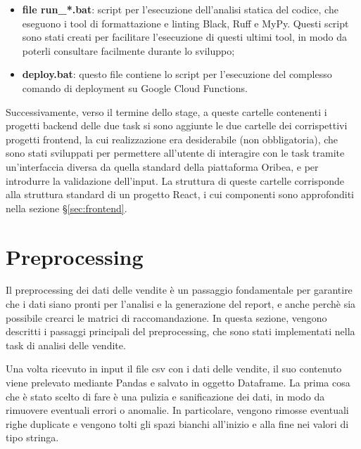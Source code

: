 \begin{itemize}
    \item \textbf{file run\_*.bat}: script per l'esecuzione dell'analisi statica del codice, che eseguono i tool di formattazione e linting Black, Ruff e MyPy. Questi script sono stati creati per facilitare l'esecuzione di questi ultimi tool, in modo da poterli consultare facilmente durante lo sviluppo;
    \item \textbf{deploy.bat}: questo file contiene lo script per l'esecuzione del complesso comando di deployment su Google Cloud Functions.
\end{itemize}

Successivamente, verso il termine dello stage, a queste cartelle contenenti i progetti backend delle due task si sono aggiunte le due cartelle dei corrispettivi progetti frontend, la cui realizzazione era desiderabile (non obbligatoria), che sono stati sviluppati per permettere all'utente di interagire con le task tramite un'interfaccia diversa da quella standard della piattaforma Oribea, e per introdurre la validazione dell'input. La struttura di queste cartelle corrisponde alla struttura standard di un progetto React, i cui componenti sono approfonditi nella sezione \S\ref{sec:frontend}.



\section{Preprocessing}
\label{sec:preprocessing}

Il preprocessing dei dati delle vendite è un passaggio fondamentale per garantire che i dati siano pronti per l'analisi e la generazione del report, e anche perchè sia possibile crearci le matrici di raccomandazione.
In questa sezione, vengono descritti i passaggi principali del preprocessing, che sono stati implementati nella task di analisi delle vendite.

Una volta ricevuto in input il file csv con i dati delle vendite, il suo contenuto viene prelevato mediante Pandas e salvato in oggetto Dataframe. La prima cosa che è stato scelto di fare è una pulizia e sanificazione dei dati, in modo da rimuovere eventuali errori o anomalie. In particolare, vengono rimosse eventuali righe duplicate e vengono tolti gli spazi bianchi all'inizio e alla fine nei valori di tipo stringa.


